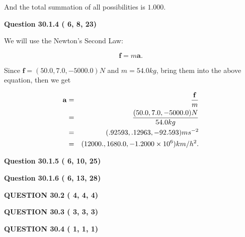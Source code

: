 \documentclass[12pt]{article}
\begin{document}
\noindent
And the total summation of all possibilities is $  %
1.000 $.
 
 
 
 
  
\vspace{0.2in}
  
{\textbf{\Large{Question
30.1.4 
 (          6,          8,         23)
}}}
  
  
 
 

We will use the Newton's Second Law:
 
\[
\mathbf{f}=m\mathbf{a}.
\]
 
Since $\mathbf{f}=( %
50.0,  %
7.0,  %
-5000.0 )N$
and $m= %
54.0kg$, bring them into the above equation, then we get
 
\begin{eqnarray*}
\mathbf{a}&=&\frac{\mathbf{f}}m  \\
&=&\frac{(
50.0 ,
7.0 ,
-5000.0 )N
}{ %
54.0 kg}  \\
&=&(
.92593 ,
.12963,
-92.593
)ms^{-2} \\
&=&(
12000. ,
1680.0 ,
-1.2000 \times 10^{6}
)km/h^2.
\end{eqnarray*}
 
 
 
  
\vspace{0.2in}
  
{\textbf{\Large{Question
30.1.5 
 (          6,         10,         25)
}}}
  
  
  
\vspace{0.2in}
  
{\textbf{\Large{Question
30.1.6 
 (          6,         13,         28)
}}}
  
  
  
\vspace{0.2in}
  
{\textbf{\Large{QUESTION
30.2 
 (          4,          4,          4)
}}}
  
  
  
\vspace{0.2in}
  
{\textbf{\Large{QUESTION
30.3 
 (          3,          3,          3)
}}}
  
  
  
\vspace{0.2in}
  
{\textbf{\Large{QUESTION
30.4 
 (          1,          1,          1)
}}}
  
  
\end{document}
